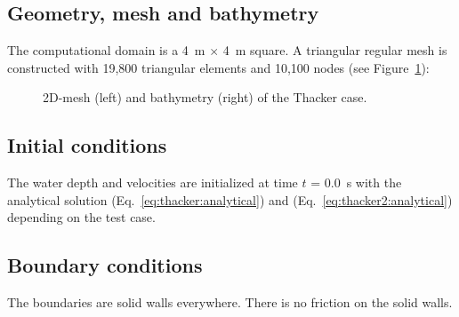 \subsection{Geometry, mesh and bathymetry}

The computational domain is a 4~m $\times$ 4~m square.
A triangular regular mesh is constructed with 19,800 triangular elements and
10,100 nodes (see Figure~\ref{fig:thacker:Mesh}):

\begin{figure}[H]
\begin{minipage}[t]{0.45\textwidth}
 \centering
\end{minipage}
\begin{minipage}[t]{0.55\textwidth}
 \centering
\end{minipage}
\caption{2D-mesh (left) and bathymetry (right) of the Thacker case.}
\label{fig:thacker:Mesh}
\end{figure}

%

\subsection{Initial conditions}

The water depth and velocities are initialized  at time $t$ = 0.0~s with the
analytical solution (Eq.~\ref{eq:thacker:analytical}) and
(Eq.~\ref{eq:thacker2:analytical}) depending on the test case.

\subsection{Boundary conditions}

The boundaries are solid walls everywhere.
There is no friction on the solid walls.

